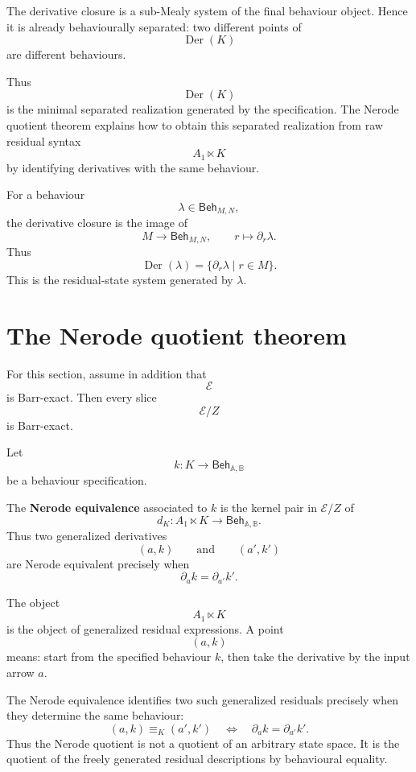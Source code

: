 \begin{remark}
\label{rem:minimality-before-quotienting}
The derivative closure is a sub-Mealy system of the final behaviour object.
Hence it is already behaviourally separated: two different points of
\[
\operatorname{Der}(K)
\]
are different behaviours.

Thus
\[
\operatorname{Der}(K)
\]
is the minimal separated realization generated by the specification. The
Nerode quotient theorem explains how to obtain this separated realization
from raw residual syntax
\[
A_1\ltimes K
\]
by identifying derivatives with the same behaviour.
\end{remark}

\begin{example}
\label{ex:monoid-derivative-closure}
For a behaviour
\[
\lambda\in\mathsf{Beh}_{M,N},
\]
the derivative closure is the image of
\[
M\to\mathsf{Beh}_{M,N},
\qquad
r\longmapsto\partial_r\lambda.
\]
Thus
\[
\operatorname{Der}(\lambda)
=
\{\partial_r\lambda\mid r\in M\}.
\]
This is the residual-state system generated by \(\lambda\).
\end{example}

\section{The Nerode quotient theorem}
\label{sec:nerode-quotient-theorem}

For this section, assume in addition that
\[
\mathcal E
\]
is Barr-exact. Then every slice
\[
\mathcal E/Z
\]
is Barr-exact.

Let
\[
k:K\to\mathsf{Beh}_{\mathbb A,\mathbb B}
\]
be a behaviour specification.

\begin{definition}
\label{def:nerode-equivalence}
The \textbf{Nerode equivalence} associated to \(k\) is the kernel pair in
\(\mathcal E/Z\) of
\[
d_K:
A_1\ltimes K
\to
\mathsf{Beh}_{\mathbb A,\mathbb B}.
\]
Thus two generalized derivatives
\[
(a,k)
\qquad\text{and}\qquad
(a',k')
\]
are Nerode equivalent precisely when
\[
\partial_a k=\partial_{a'}k'.
\]
\end{definition}

\begin{remark}
\label{rem:what-nerode-identifies}
The object
\[
A_1\ltimes K
\]
is the object of generalized residual expressions. A point
\[
(a,k)
\]
means: start from the specified behaviour \(k\), then take the derivative by
the input arrow \(a\).

The Nerode equivalence identifies two such generalized residuals precisely
when they determine the same behaviour:
\[
(a,k)\equiv_K(a',k')
\quad\Longleftrightarrow\quad
\partial_a k=\partial_{a'}k'.
\]
Thus the Nerode quotient is not a quotient of an arbitrary state space. It is
the quotient of the freely generated residual descriptions by behavioural
equality.
\end{remark}

